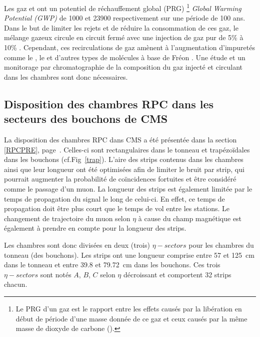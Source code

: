 Les gaz  et  ont un  potentiel de réchauffement global (PRG) \footnote{Le PRG d’un gaz est le rapport entre les effets causés par la libération en début de période d’une masse donnée de ce gaz et ceux causés par la même masse de dioxyde de carbone ().} \textit{Global Warming Potential (GWP)} de \num{1000} et \num{23900} respectivement sur une période de \num{100} ans. Dans le but de limiter les rejets et de réduire la consommation de ces gaz, le mélange gazeux circule en circuit fermé avec une injection de gaz pur de \num{5}\% à \num{10}\% \cite{5401780}. Cependant, ces recirculations de gaz amènent à l'augmentation d'impuretés comme le , le  et d'autres types de molécules à base de Fréon \cite{1748-0221-8-08-T08003}. Une étude et un monitorage par chromatographie de la composition du gaz injecté et circulant dans les chambres sont donc nécessaires. 

\subsection{Disposition des chambres RPC dans les secteurs des bouchons de CMS}
\vspace{-0.2cm}
La disposition des chambres RPC dans CMS a été présentée dans la section \ref{RPCPRE}, page~\pageref{RPCPRE}. Celles-ci sont rectangulaires dans le tonneau et trapézoïdales dans les bouchons (cf.Fig~\ref{trap}). L'aire des strips contenus dans les chambres ainsi que leur longueur ont été optimisées afin de limiter le bruit par strip, qui pourrait augmenter la probabilité de coïncidences fortuites et être considéré comme le passage d'un muon. La longueur des strips est également limitée par le temps de propagation du signal le long de celui-ci. En effet, ce temps de propagation doit être plus court que le temps de vol entre les stations. Le changement de trajectoire du muon selon $\eta$ à cause du champ magnétique est également à prendre en compte pour la longueur des strips.

Les chambres sont donc divisées en deux (trois) $\eta-sectors$ pour les chambres du tonneau (des bouchons). Les strips ont une longueur comprise entre \num{57} et \SI{125}{\centi\meter} dans le tonneau et entre \num{39.8} et \SI{79.72}{\centi\meter} dans les bouchons. Ces trois $\eta-sectors$ sont notés $A$, $B$, $C$ selon $\eta$ décroissant et comportent \num{32} strips chacun.

